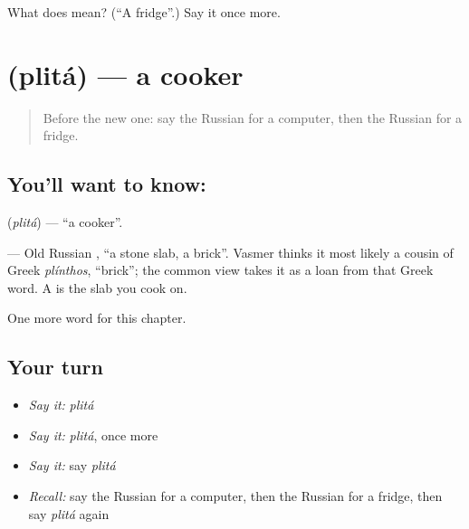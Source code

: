 \begin{tcolorbox}[breakable,colback=teal!4,colframe=teal!35!black,title={Before you move on}]
What does  mean? (\textquotedblleft{}A fridge\textquotedblright{}.) Say it once more.
\end{tcolorbox}
\section[\texorpdfstring{\ru{плита} (plitá)}{плита (plitá)}]{ (plitá) — a cooker}

\label{lesson:RU-C94-cooker}



\begin{quote}
Before the new one: say the Russian for a computer, then the Russian for a fridge.
\end{quote}

\subsection*{You'll want to know: }
\textbf{} (\emph{plitá}) — \textquotedblleft{}a cooker\textquotedblright{}.

\begin{cousinweb}
\textbf{} — Old Russian \emph{}, \textquotedblleft{}a stone slab, a brick\textquotedblright{}. Vasmer thinks it most likely a cousin of Greek \emph{plínthos}, \textquotedblleft{}brick\textquotedblright{}; the common view takes it as a loan from that Greek word. A \emph{} is the slab you cook on.
\end{cousinweb}

\begin{grammarlens}[title={What you've built}]
One more word for this chapter.
\end{grammarlens}

\subsection*{Your turn}
\begin{itemize}
\raggedright
  \item \emph{Say it:} \emph{plitá}
  \item \emph{Say it:} \emph{plitá}, once more
  \item \emph{Say it:} say \emph{plitá}
  \item \emph{Recall:} say the Russian for a computer, then the Russian for a fridge, then say \emph{plitá} again
\end{itemize}

